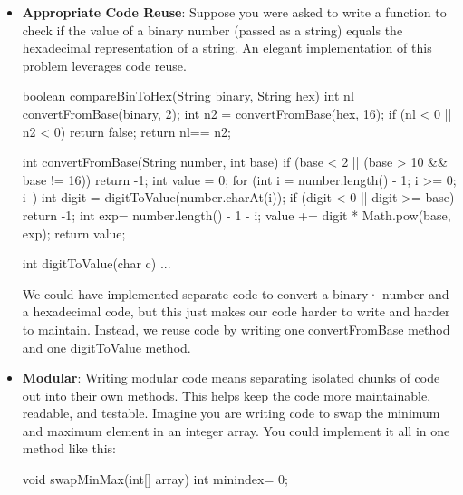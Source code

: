 \documentclass{report}
\begin{document}
\begin{itemize}
\begin{enumerate}
\begin{cppcode}
                        ExprTerm[] sum(ExprTerm[] e1, ExprTerm[] e2) {
                            ...
                        }
                    \end{cppcode}
            \end{enumerate}
        \item \textbf{Appropriate Code Reuse}: Suppose you were asked to write a function to check if the value of a binary number (passed as a string) equals the hexadecimal representation of a string.
            \bigbreak \noindent 
            An elegant implementation of this problem leverages code reuse.
            \bigbreak \noindent 
            \begin{cppcode}
                boolean compareBinToHex(String binary, String hex) {
                    int nl convertFromBase(binary, 2);
                    int n2 = convertFromBase(hex, 16);
                    if (nl < 0 || n2 < 0) {
                        return false;
                    }
                    return nl== n2;
                }

                int convertFromBase(String number, int base) {
                    if (base < 2 || (base > 10 && base != 16)) return -1;
                    int value = 0;
                    for (int i = number.length() - 1; i >= 0; i--) {
                        int digit = digitToValue(number.charAt(i));
                        if (digit < 0 || digit >= base) {
                            return -1;
                        }
                        int exp= number.length() - 1 - i;
                        value += digit * Math.pow(base, exp);
                    }
                    return value;
                }

                int digitToValue(char c) { ... }
            \end{cppcode}
            \bigbreak \noindent 
            We could have implemented separate code to convert a binary· number and a hexadecimal code, but this just makes our code harder to write and harder to maintain. Instead, we reuse code by writing one convertFromBase method and one digitToValue method.
        \item \textbf{Modular}: Writing modular code means separating isolated chunks of code out into their own methods. This helps keep the code more maintainable, readable, and testable.
            \bigbreak \noindent 
            Imagine you are writing code to swap the minimum and maximum element in an integer array. You could implement it all in one method like this:
            \bigbreak \noindent 
            \begin{cppcode}
                void swapMinMax(int[] array) {
                    int minindex= 0;
                }


\end{cppcode}
\end{itemize}
\end{document}
